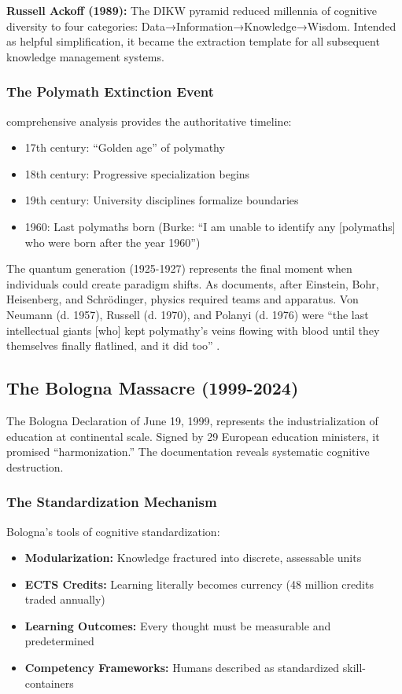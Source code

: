 \textbf{Russell Ackoff (1989):} The DIKW pyramid reduced millennia of cognitive diversity to four categories: Data→Information→Knowledge→Wisdom. Intended as helpful simplification, it became the extraction template for all subsequent knowledge management systems.

\subsubsection{The Polymath Extinction Event}

\citet{burke2020} comprehensive analysis provides the authoritative timeline:
\begin{itemize}
\item 17th century: ``Golden age'' of polymathy
\item 18th century: Progressive specialization begins
\item 19th century: University disciplines formalize boundaries
\item 1960: Last polymaths born (Burke: ``I am unable to identify any [polymaths] who were born after the year 1960'')
\end{itemize}

The quantum generation (1925-1927) represents the final moment when individuals could create paradigm shifts. As \citet{beller1996} documents, after Einstein, Bohr, Heisenberg, and Schrödinger, physics required teams and apparatus. Von Neumann (d. 1957), Russell (d. 1970), and Polanyi (d. 1976) were ``the last intellectual giants [who] kept polymathy's veins flowing with blood until they themselves finally flatlined, and it did too'' \citep{hoel2025}.

\subsection{The Bologna Massacre (1999-2024)}

The Bologna Declaration of June 19, 1999, represents the industrialization of education at continental scale. Signed by 29 European education ministers, it promised ``harmonization.'' The documentation reveals systematic cognitive destruction.

\subsubsection{The Standardization Mechanism}

Bologna's tools of cognitive standardization:
\begin{itemize}
\item \textbf{Modularization:} Knowledge fractured into discrete, assessable units
\item \textbf{ECTS Credits:} Learning literally becomes currency (48 million credits traded annually)
\item \textbf{Learning Outcomes:} Every thought must be measurable and predetermined
\item \textbf{Competency Frameworks:} Humans described as standardized skill-containers
\end{itemize}

